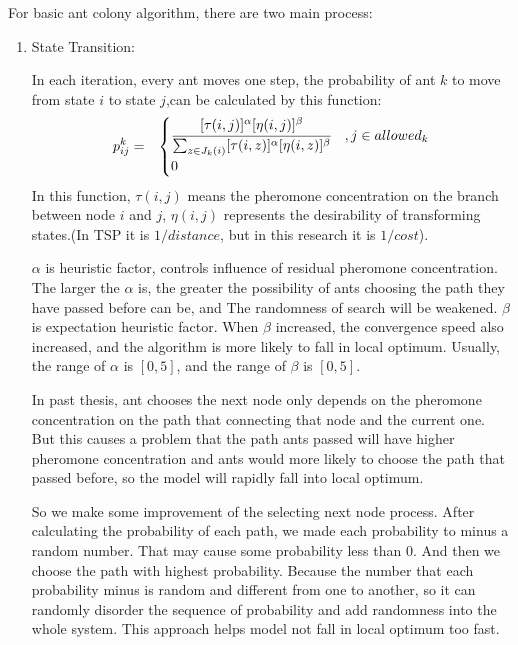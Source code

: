 \documentclass[senior]{IPSstyle}
\begin{document}
For basic ant colony algorithm, there are two main process:
\begin{enumerate}
    \item State Transition:
    
    In each iteration, every ant moves one step, the probability of ant \(k\) to move from state \(i\) to state \(j\),can be calculated by this function:
    \begin{eqnarray}\label{probability}
    p_{ij}^k &=&
    \begin{cases}
    \cfrac{[\tau(i,j)]^\alpha [\eta(i,j)]^\beta}{\sum_{z\in J_k(i)} [\tau(i,z)]^\alpha [\eta(i,z)]^\beta} &, j\in allowed_k \cr
    0 \cr
    \end{cases}
    \end{eqnarray}
    In this function, \(\tau(i,j)\) means the pheromone concentration on the branch between node \(i\) and \(j\), \(\eta(i,j)\) represents the desirability of transforming states.(In TSP it is \(1/distance\), but in this research it is \(1/cost\)). 
    
    \(\alpha\) is heuristic factor, controls influence of residual pheromone concentration. The larger the \(\alpha\) is, the greater the possibility of ants choosing the path they have passed before can be, and The randomness of search will be weakened. \(\beta\) is expectation heuristic factor. When \(\beta\) increased, the convergence speed also increased, and the algorithm is more likely to fall in local optimum. 
    Usually, the range of \(\alpha\) is \([0,5]\), and the range of \(\beta\) is  \([0,5]\).
    
    In past thesis\cite{sousa2015airline}, ant chooses the next node only depends on the pheromone concentration on the path that connecting that node and the current one. But this causes a problem that the path ants passed will have higher pheromone concentration and ants would more likely to choose the path that passed before, so the model will rapidly fall into local optimum.
    
    So we make some improvement of the selecting next node process. After calculating the probability of each path, we made each probability to minus a random number. That may cause some probability less than 0. And then we choose the path with highest probability. Because the number that each probability minus is random and different from one to another, so it can randomly disorder the sequence of probability and add randomness into the whole system. This approach helps model not fall in local optimum too fast.
    

\end{enumerate}
\end{document}
